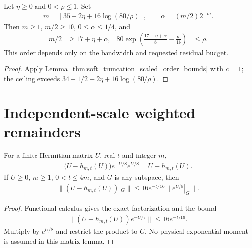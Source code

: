 \begin{lemma}
    \label{thm:soft_truncation_residual_order}
    \leanok
    Let $\eta\ge0$ and $0<\rho\le1$. Set
    \begin{align*}
        m=\left\lceil35+2\eta+16\log(80/\rho)\right\rceil,
        \qquad\alpha=(m/2)2^{-m}.
    \end{align*}
    Then $m\ge1$, $m/2\ge10$, $0\le\alpha\le1/4$, and
    \begin{align*}
        m/2                                                     & \ge17+\eta+\alpha, &
        80\exp\left(\frac{17+\eta+\alpha}{8}-\frac m{16}\right) & \le\rho.
    \end{align*}
    This order depends only on the bandwidth and requested residual budget.
\end{lemma}
\begin{proof}\leanok
    Apply Lemma~\ref{thm:soft_truncation_scaled_order_bounds} with $c=1$;
    the ceiling exceeds $34+1/2+2\eta+16\log(80/\rho)$.
\end{proof}


\section{Independent-scale weighted remainders}

\begin{lemma}
    \label{thm:soft_truncation_scaled_matrix_remainder}
    \leanok
    For a finite Hermitian matrix $U$, real $t$ and integer $m$,
    \begin{align*}
        \bigl(U-h_{m,t}(U)\bigr)e^{-U/8}e^{U/8}
        =U-h_{m,t}(U).
    \end{align*}
    If $U\geq0$, $m\geq1$, $0<t\leq4m$, and $G$ is any subspace,
    then
    \begin{align*}
        \|(U-h_{m,t}(U))|_G\|
        \leq16e^{-t/16}\|e^{U/8}|_G\|.
    \end{align*}
\end{lemma}
\begin{proof}\leanok
    Functional calculus gives the exact factorization and the bound
    \begin{align*}
        \|(U-h_{m,t}(U))e^{-U/8}\|\leq16e^{-t/16}.
    \end{align*}
    Multiply by $e^{U/8}$ and restrict the product to $G$.
    No physical exponential moment is assumed in this matrix lemma.
\end{proof}


